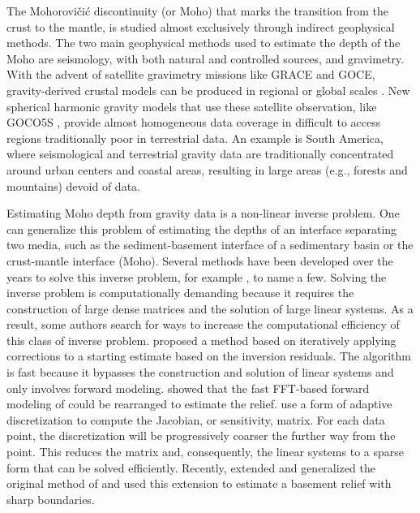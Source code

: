 \documentclass[extra,mreferee]{gji}
\begin{document}
The Mohorovičić discontinuity (or Moho) that marks the transition from the
crust to the mantle, is studied almost exclusively through indirect geophysical
methods.
The two main geophysical methods used to estimate the depth of the Moho are
seismology, with both natural and controlled sources, and gravimetry.
With the advent of satellite gravimetry missions like GRACE and GOCE,
gravity-derived crustal models can be produced in regional or global scales
\citep[e.g. ][]{reguzzoni2013,vandermeijde2013,vandermeijde2015}.
New spherical harmonic gravity models that use these satellite observation,
like GOCO5S \citep{mayer-guerr2015}, provide almost homogeneous data coverage
in difficult to access regions traditionally poor in terrestrial data.
An example is South America, where seismological and terrestrial gravity data
are traditionally concentrated around urban centers and coastal areas,
resulting in large areas (e.g., forests and mountains) devoid of data.

Estimating Moho depth from gravity data is a non-linear inverse problem.
One can generalize this problem of estimating the depths of an interface
separating two media,
such as the sediment-basement interface of a sedimentary basin or the
crust-mantle interface (Moho).
Several methods have been developed over the years to solve this inverse
problem, for example
\citet{bott1960, barbosa1999b, barbosa1999a, barnes2012, leao1996, martins2010,
martins2011, oldenburg1974, reguzzoni2013, santos2015, silva2006, silva2014},
to name a few.
Solving the inverse problem is computationally demanding because it requires
the construction of large dense matrices and the solution of large linear
systems.
As a result, some authors search for ways to increase the computational
efficiency of this class of inverse problem.
\citet{bott1960} proposed a method based on iteratively applying corrections to
a starting estimate based on the inversion residuals.
The algorithm is fast because it bypasses the construction and solution of
linear systems and only involves forward modeling.
\citet{oldenburg1974} showed that the fast FFT-based forward modeling of
\citet{parker1973} could be rearranged to estimate the relief.
\citet{barnes2012} use a form of adaptive discretization to compute the
Jacobian, or sensitivity, matrix.
For each data point, the discretization will be progressively coarser
the further way from the point.
This reduces the matrix and, consequently, the linear systems to a sparse form
that can be solved efficiently.
Recently, \citet{silva2014} extended and generalized the original method of
\citet{bott1960} and \citet{santos2015} used this extension to estimate a
basement relief with sharp boundaries.
\end{document}
